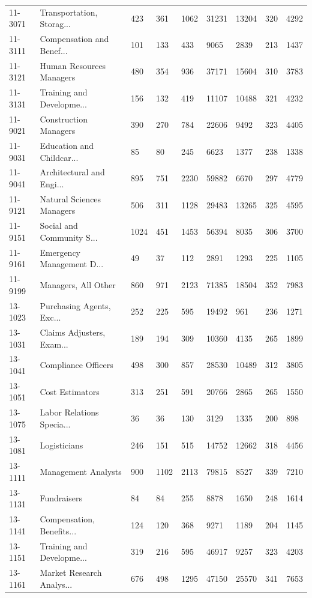 \begin{longtable}{p{0.9cm}p{3.4cm}p{1.0cm}p{1.05cm}p{1.1cm}p{1.05cm}p{1.0cm}p{1.0cm}p{1.1cm}}
11-3071 & Transportation, Storag... & 423 & 361 & 1062 & 31231 & 13204 & 320 & 4292 \\
11-3111 & Compensation and Benef... & 101 & 133 & 433 & 9065 & 2839 & 213 & 1437 \\
11-3121 & Human Resources Managers & 480 & 354 & 936 & 37171 & 15604 & 310 & 3783 \\
11-3131 & Training and Developme... & 156 & 132 & 419 & 11107 & 10488 & 321 & 4232 \\
11-9021 & Construction Managers & 390 & 270 & 784 & 22606 & 9492 & 323 & 4405 \\
11-9031 & Education and Childcar... & 85 & 80 & 245 & 6623 & 1377 & 238 & 1338 \\
11-9041 & Architectural and Engi... & 895 & 751 & 2230 & 59882 & 6670 & 297 & 4779 \\
11-9121 & Natural Sciences Managers & 506 & 311 & 1128 & 29483 & 13265 & 325 & 4595 \\
11-9151 & Social and Community S... & 1024 & 451 & 1453 & 56394 & 8035 & 306 & 3700 \\
11-9161 & Emergency Management D... & 49 & 37 & 112 & 2891 & 1293 & 225 & 1105 \\
11-9199 & Managers, All Other & 860 & 971 & 2123 & 71385 & 18504 & 352 & 7983 \\
13-1023 & Purchasing Agents, Exc... & 252 & 225 & 595 & 19492 & 961 & 236 & 1271 \\
13-1031 & Claims Adjusters, Exam... & 189 & 194 & 309 & 10360 & 4135 & 265 & 1899 \\
13-1041 & Compliance Officers & 498 & 300 & 857 & 28530 & 10489 & 312 & 3805 \\
13-1051 & Cost Estimators & 313 & 251 & 591 & 20766 & 2865 & 265 & 1550 \\
13-1075 & Labor Relations Specia... & 36 & 36 & 130 & 3129 & 1335 & 200 & 898 \\
13-1081 & Logisticians & 246 & 151 & 515 & 14752 & 12662 & 318 & 4456 \\
13-1111 & Management Analysts & 900 & 1102 & 2113 & 79815 & 8527 & 339 & 7210 \\
13-1131 & Fundraisers & 84 & 84 & 255 & 8878 & 1650 & 248 & 1614 \\
13-1141 & Compensation, Benefits... & 124 & 120 & 368 & 9271 & 1189 & 204 & 1145 \\
13-1151 & Training and Developme... & 319 & 216 & 595 & 46917 & 9257 & 323 & 4203 \\
13-1161 & Market Research Analys... & 676 & 498 & 1295 & 47150 & 25570 & 341 & 7653 \\

\end{longtable}
